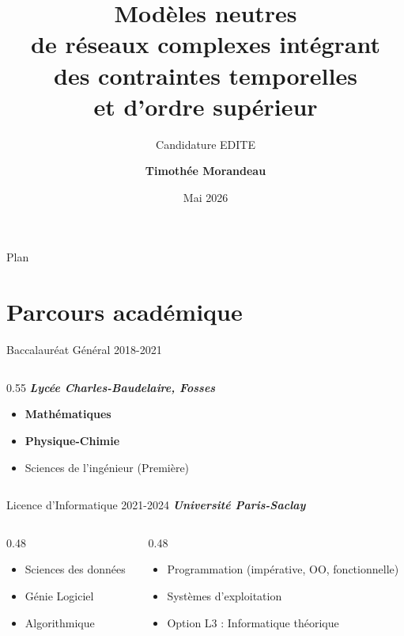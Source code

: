 \documentclass[aspectratio=169, 12pt]{beamer}
\title{\Large Modèles neutres\\ de réseaux complexes intégrant \\ des contraintes temporelles\\ et d'ordre supérieur}
\subtitle{Candidature EDITE}
\author{\textbf{Timothée Morandeau}}
\date{Mai 2026}
\institute{%
  LIP6 - ComplexNetworks, Sorbonne Université
}
\newcommand{\highlight}[1]{\textbf{\textcolor{LIP6teal}{#1}}}
\begin{document}

\maketitle

\begin{frame}{Plan}
  \tableofcontents
\end{frame}

\section{Parcours académique}

\begin{frame}{Baccalauréat Général \hfill{\small 2018-2021}}
  \begin{columns}[c]
    \begin{column}{0.55\textwidth}
      \textbf{\textit{Lycée Charles-Baudelaire, Fosses}}
      \medskip

      \begin{itemize}
        \item \highlight{Mathématiques}
        \item \highlight{Physique-Chimie}
        \item Sciences de l'ingénieur (Première)
      \end{itemize}
    \end{column}
  \end{columns}
\end{frame}

\begin{frame}{Licence d'Informatique \hfill{\small 2021-2024}}
  \textit{\textbf{Université Paris-Saclay}}
  \medskip

  \begin{columns}[T]
    \begin{column}{0.48\textwidth}
      \begin{itemize}
        \item Sciences des données
        \item Génie Logiciel
        \item Algorithmique
      \end{itemize}
    \end{column}
    \begin{column}{0.48\textwidth}
      \begin{itemize}
        \item Programmation (impérative, OO, fonctionnelle)
        \item Systèmes d'exploitation
        \item \alert{Option L3 :} Informatique théorique
      \end{itemize}
    \end{column}
  \end{columns}
\end{frame}
\end{document}
